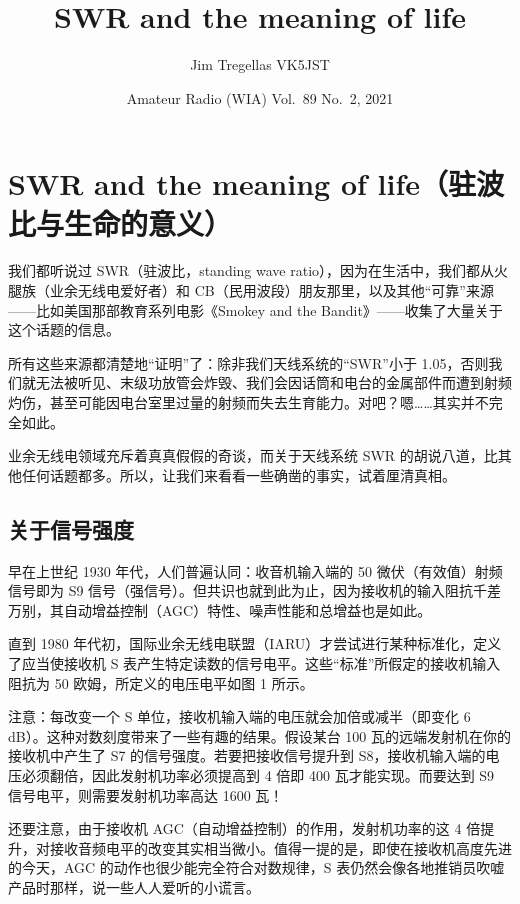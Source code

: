 \documentclass[11pt]{article}
\title{SWR and the meaning of life}
\author{Jim Tregellas VK5JST}
\date{Amateur Radio (WIA) Vol.\ 89 No.\ 2, 2021}
\begin{document}
\maketitle

\section*{SWR and the meaning of life（驻波比与生命的意义）}

我们都听说过 SWR（驻波比，standing wave ratio），因为在生活中，我们都从火腿族（业余无线电爱好者）和 CB（民用波段）朋友那里，以及其他“可靠”来源——比如美国那部教育系列电影《Smokey and the Bandit》——收集了大量关于这个话题的信息。

所有这些来源都清楚地“证明”了：除非我们天线系统的“SWR”小于 1.05，否则我们就无法被听见、末级功放管会炸毁、我们会因话筒和电台的金属部件而遭到射频灼伤，甚至可能因电台室里过量的射频而失去生育能力。对吧？嗯……其实并不完全如此。

业余无线电领域充斥着真真假假的奇谈，而关于天线系统 SWR 的胡说八道，比其他任何话题都多。所以，让我们来看看一些确凿的事实，试着厘清真相。

\subsection*{关于信号强度}

早在上世纪 1930 年代，人们普遍认同：收音机输入端的 50 微伏（有效值）射频信号即为 S9 信号（强信号）。但共识也就到此为止，因为接收机的输入阻抗千差万别，其自动增益控制（AGC）特性、噪声性能和总增益也是如此。

直到 1980 年代初，国际业余无线电联盟（IARU）才尝试进行某种标准化，定义了应当使接收机 S 表产生特定读数的信号电平。这些“标准”所假定的接收机输入阻抗为 50 欧姆，所定义的电压电平如图 1 所示。

注意：每改变一个 S 单位，接收机输入端的电压就会加倍或减半（即变化 6 dB）。这种对数刻度带来了一些有趣的结果。假设某台 100 瓦的远端发射机在你的接收机中产生了 S7 的信号强度。若要把接收信号提升到 S8，接收机输入端的电压必须翻倍，因此发射机功率必须提高到 4 倍即 400 瓦才能实现。而要达到 S9 信号电平，则需要发射机功率高达 1600 瓦！

还要注意，由于接收机 AGC（自动增益控制）的作用，发射机功率的这 4 倍提升，对接收音频电平的改变其实相当微小。值得一提的是，即使在接收机高度先进的今天，AGC 的动作也很少能完全符合对数规律，S 表仍然会像各地推销员吹嘘产品时那样，说一些人人爱听的小谎言。
\end{document}
